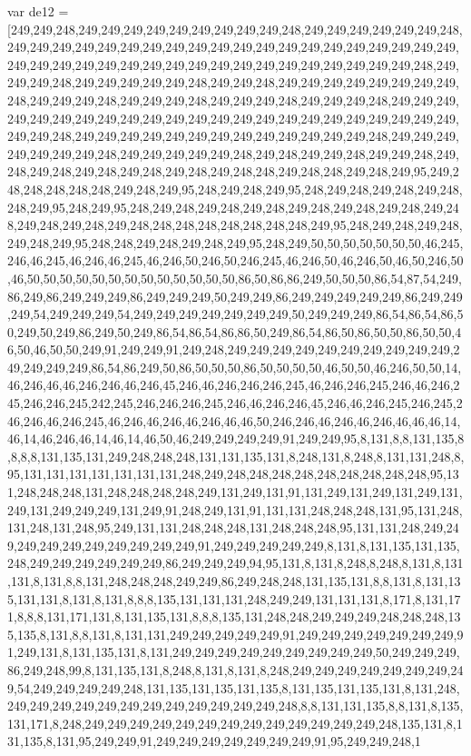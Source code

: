 var de12 = [249,249,248,249,249,249,249,249,249,249,249,249,248,249,249,249,249,249,249,248,249,249,249,249,249,249,249,249,249,249,249,249,249,249,249,249,249,249,249,249,249,249,249,249,249,249,249,249,249,249,249,249,249,249,249,249,249,249,248,249,249,249,248,249,249,249,249,249,248,249,249,248,249,249,249,249,249,249,249,249,248,249,249,249,248,249,249,249,248,249,249,249,248,249,249,249,248,249,249,249,249,249,249,249,249,249,249,249,249,249,249,249,249,249,249,249,249,249,249,249,249,249,248,249,249,249,249,249,249,249,249,249,249,249,249,249,248,249,249,249,249,249,249,249,248,249,249,249,249,249,248,249,248,249,249,248,249,249,248,249,248,249,248,249,248,249,248,249,248,249,248,248,249,248,248,249,248,249,95,249,248,248,248,248,248,249,248,249,95,248,249,248,249,95,248,249,248,249,248,249,248,248,249,95,248,249,95,248,249,248,249,248,249,248,249,248,249,248,249,248,249,248,249,248,249,248,249,248,248,248,248,248,248,248,248,249,95,248,249,248,249,248,249,248,249,95,248,248,249,248,249,248,249,95,248,249,50,50,50,50,50,50,50,46,245,246,46,245,46,246,46,245,46,246,50,246,50,246,245,46,246,50,46,246,50,46,50,246,50,46,50,50,50,50,50,50,50,50,50,50,50,50,50,86,50,86,86,249,50,50,50,86,54,87,54,249,86,249,86,249,249,249,86,249,249,249,50,249,249,86,249,249,249,249,249,86,249,249,249,54,249,249,249,54,249,249,249,249,249,249,249,50,249,249,249,86,54,86,54,86,50,249,50,249,86,249,50,249,86,54,86,54,86,86,50,249,86,54,86,50,86,50,50,86,50,50,46,50,46,50,50,249,91,249,249,91,249,248,249,249,249,249,249,249,249,249,249,249,249,249,249,249,86,54,86,249,50,86,50,50,50,86,50,50,50,50,46,50,50,46,246,50,50,14,46,246,46,46,246,246,46,246,45,246,46,246,246,246,245,46,246,246,245,246,46,246,245,246,246,245,242,245,246,246,246,245,246,46,246,246,45,246,46,246,245,246,245,246,246,46,246,245,46,246,46,246,46,246,46,46,50,246,246,46,246,46,246,46,46,46,14,46,14,46,246,46,14,46,14,46,50,46,249,249,249,249,91,249,249,95,8,131,8,8,131,135,8,8,8,8,131,135,131,249,248,248,248,131,131,135,131,8,248,131,8,248,8,131,131,248,8,95,131,131,131,131,131,131,131,248,249,248,248,248,248,248,248,248,248,248,95,131,248,248,248,131,248,248,248,248,249,131,249,131,91,131,249,131,249,131,249,131,249,131,249,249,249,131,249,91,248,249,131,91,131,131,248,248,248,131,95,131,248,131,248,131,248,95,249,131,131,248,248,248,131,248,248,248,95,131,131,248,249,249,249,249,249,249,249,249,249,249,91,249,249,249,249,249,8,131,8,131,135,131,135,248,249,249,249,249,249,249,86,249,249,249,94,95,131,8,131,8,248,8,248,8,131,8,131,131,8,131,8,8,131,248,248,248,249,249,86,249,248,248,131,135,131,8,8,131,8,131,135,131,131,8,131,8,131,8,8,8,135,131,131,131,248,249,249,131,131,131,8,171,8,131,171,8,8,8,131,171,131,8,131,135,131,8,8,8,135,131,248,248,249,249,249,248,248,248,135,135,8,131,8,8,131,8,131,131,249,249,249,249,249,91,249,249,249,249,249,249,249,91,249,131,8,131,135,131,8,131,249,249,249,249,249,249,249,249,249,50,249,249,249,86,249,248,99,8,131,135,131,8,248,8,131,8,131,8,248,249,249,249,249,249,249,249,249,54,249,249,249,249,248,131,135,131,135,131,135,8,131,135,131,135,131,8,131,248,249,249,249,249,249,249,249,249,249,249,249,249,248,8,8,131,131,135,8,8,131,8,135,131,171,8,248,249,249,249,249,249,249,249,249,249,249,249,249,249,248,135,131,8,131,135,8,131,95,249,249,91,249,249,249,249,249,249,249,91,95,249,249,248,1